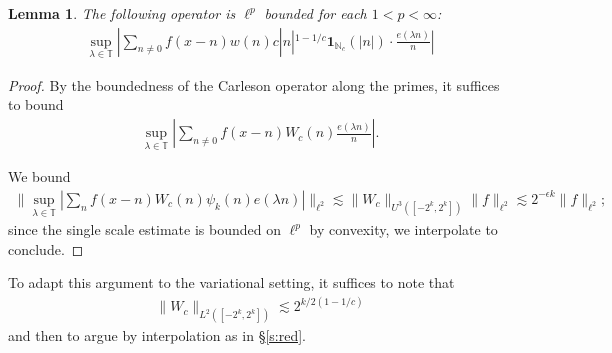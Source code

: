 \documentclass[12pt]{amsart}
\numberwithin{equation}{section}
\newtheorem{lemma}[theorem]{Lemma}
\theoremstyle{definition}
\begin{document}
\begin{lemma}\label{l:Pscar}
 The following operator is $\ell^p$ bounded for each $1 < p <\infty$:
 \begin{align}
    \sup_{\lambda \in \mathbb{T}} |\sum_{n \neq 0} f(x-n) w(n) c |n|^{1-1/c} \mathbf{1}_{\mathbb{N}_c}(|n|) \cdot \frac{e(\lambda n)}{n} | 
 \end{align}
\end{lemma}
\begin{proof}
By the boundedness of the Carleson operator along the primes, it suffices to bound
     \begin{align}
    \sup_{\lambda \in \mathbb{T}} |\sum_{n \neq 0} f(x-n) W_c(n) \frac{e(\lambda n)}{n} |. 
 \end{align}
    
We bound
    \begin{align}
\| \sup_{\lambda \in \mathbb{T}} |\sum_n  f(x-n) W_c(n) \psi_k(n) e(\lambda n)| \|_{\ell^2} \lesssim \|W_c\|_{U^3([-2^k,2^k])} \|f \|_{\ell^2} \lesssim 2^{-\epsilon k } \|f\|_{\ell^2};
    \end{align}
since the single scale estimate is bounded on $\ell^p$ by convexity, we interpolate to conclude. 
\end{proof}
To adapt this argument to the variational setting, it suffices to note that 
\begin{align}
    \| W_c \|_{L^2([-2^k,2^k])} \lesssim 2^{k/2(1-1/c)}
\end{align}
and then to argue by interpolation as in \S \ref{s:red}. 
\end{document}
